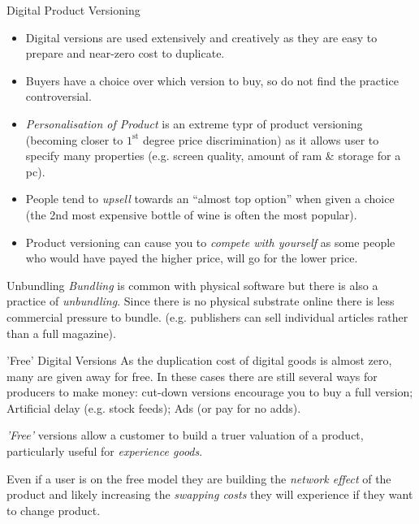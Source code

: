 \documentclass[11pt,a4paper]{article}
\begin{document}
\begin{proposition}{Digital Product Versioning}
  \begin{itemize}
    \item Digital versions are used extensively and creatively as they are easy to prepare and near-zero cost to duplicate.
    \item Buyers have a choice over which version to buy, so do not find the practice controversial.
    \item \textit{Personalisation of Product} is an extreme typr of product versioning (becoming closer to $1^\text{st}$ degree price discrimination) as it allows user to specify many properties (e.g. screen quality, amount of ram \& storage for a pc).
    \item People tend to \textit{upsell} towards an ``almost top option'' when given a choice (the 2nd most expensive bottle of wine is often the most popular).
    \item Product versioning can cause you to \textit{compete with yourself} as some people who would have payed the higher price, will go for the lower price.
  \end{itemize}
\end{proposition}

\begin{remark}{Unbundling}
  \textit{Bundling} is common with physical software but there is also a practice of \textit{unbundling}. Since there is no physical substrate online there is less commercial pressure to bundle. (e.g. publishers can sell individual articles rather than a full magazine).
\end{remark}

\begin{remark}{'Free' Digital Versions}
  As the duplication cost of digital goods is almost zero, many are given away for free. In these cases there are still several ways for producers to make money: cut-down versions encourage you to buy a full version; Artificial delay (e.g. stock feeds); Ads (or pay for no adds).
  \par \textit{'Free'} versions allow a customer to build a truer valuation of a product, particularly useful for \textit{experience goods}.
  \par Even if a user is on the free model they are building the \textit{network effect} of the product and likely increasing the \textit{swapping costs} they will experience if they want to change product.
\end{remark}
\end{document}
